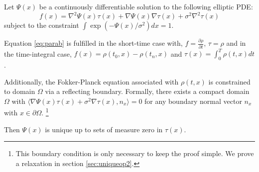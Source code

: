 \documentclass{article}
\begin{document}
\begin{thm}\label{thm:uniqueop}
Let $\Psi(x)$ be a continuously differentiable solution to the following elliptic PDE:
\begin{equation}\label{eq:parab}
f(x) = \nabla^2 \Psi(x) \tau(x) + \nabla \Psi(x) \nabla \tau(x) + \sigma^2 \nabla^2 \tau(x)
\end{equation}
subject to the constraint $\int \exp(-\Psi(x)/\sigma^2) dx = 1$.

Equation \ref{eq:parab} is fulfilled in the short-time case with, $f=\frac{\partial \rho}{\partial t}$, $\tau = \rho$ and in the time-integral case, $f(x)=\rho(t_0,x)-\rho(t_n,x)$ and $\tau(x) = \int_0^T \rho(t,x)dt$.

Additionally, the Fokker-Planck equation associated with $\rho(t,x)$ is constrained to domain $\Omega$ via a reflecting boundary. Formally, there exists a compact domain $\Omega$ with $\langle \nabla \Psi(x) \tau(x) + \sigma^2\nabla \tau(x) , n_x \rangle = 0$ for any boundary normal vector $n_x$ with $x \in \partial \Omega$. \footnote{This boundary condition is only necessary to keep the proof simple. We prove a relaxation in section \ref{sec:uniqueop2}.}

 Then $\Psi(x)$ is unique up to sets of measure zero in $\tau(x)$.
\end{thm}
\end{document}
